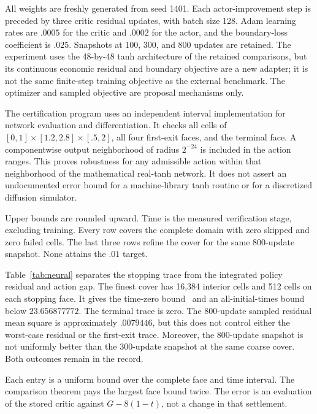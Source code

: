 All weights are freshly generated from seed 1401. Each actor-improvement step is preceded by three critic residual updates, with batch size 128. Adam learning rates are $.0005$ for the critic and $.0002$ for the actor, and the boundary-loss coefficient is $.025$. Snapshots at 100, 300, and 800 updates are retained. The experiment uses the 48-by-48 tanh architecture of the retained comparisons, but its continuous economic residual and boundary objective are a new adapter; it is not the same finite-step training objective as the external benchmark. The optimizer and sampled objective are proposal mechanisms only.

The certification program uses an independent interval implementation for network evaluation and differentiation. It checks all cells of $[0,1]\times[1.2,2.8]\times[.5,2]$, all four first-exit faces, and the terminal face. A componentwise output neighborhood of radius $2^{-24}$ is included in the action ranges. This proves robustness for any admissible action within that neighborhood of the mathematical real-tanh network. It does not assert an undocumented error bound for a machine-library tanh routine or for a discretized diffusion simulator.

\begin{table}[t]\centering\small
\caption{Whole-domain neural certificates on the unchanged economy, $k=2$}\label{tab:neural}

\par\smallskip\footnotesize Upper bounds are rounded upward. Time is the measured verification stage, excluding training. Every row covers the complete domain with zero skipped and zero failed cells. The last three rows refine the cover for the same 800-update snapshot. None attains the $.01$ target.
\end{table}

Table~\ref{tab:neural} separates the stopping trace from the integrated policy residual and action gap. The finest cover has 16,384 interior cells and 512 cells on each stopping face. It gives the time-zero bound \neuralbound\ and an all-initial-times bound below $23.656877772$. The terminal trace is zero. The 800-update sampled residual mean square is approximately $.0079446$, but this does not control either the worst-case residual or the first-exit trace. Moreover, the 800-update snapshot is not uniformly better than the 300-update snapshot at the same coarse cover. Both outcomes remain in the record.

\begin{table}[t]\centering\small
\caption{Stopping-trace errors for the finest neural cover}\label{tab:boundary}

\par\smallskip\footnotesize Each entry is a uniform bound over the complete face and time interval. The comparison theorem pays the largest face bound twice. The error is an evaluation of the stored critic against $G-8(1-t)$, not a change in that settlement.
\end{table}

